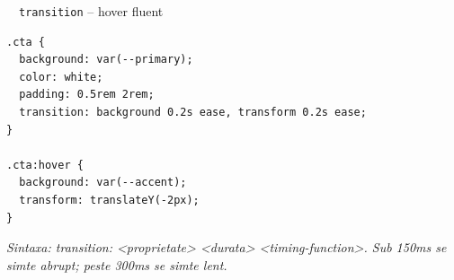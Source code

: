 \documentclass[aspectratio=169,11pt]{beamer}
\newcommand{\code}[1]{{\ttfamily\small\color{accent!85!black}#1}}
\begin{document}
\begin{frame}[fragile]{\textcolor{themeCss}{\faPaintBrush}\ \ \texttt{transition} -- hover fluent}
\vspace{6pt}
\begin{lstlisting}[style=css]
.cta {
  background: var(--primary);
  color: white;
  padding: 0.5rem 2rem;
  transition: background 0.2s ease, transform 0.2s ease;
}

.cta:hover {
  background: var(--accent);
  transform: translateY(-2px);
}
\end{lstlisting}
\vspace{4pt}
{\footnotesize\color{textDim}\itshape Sintaxa: \code{transition: <proprietate> <durata> <timing-function>}. Sub 150ms se simte abrupt; peste 300ms se simte lent.}
\end{frame}
\end{document}
